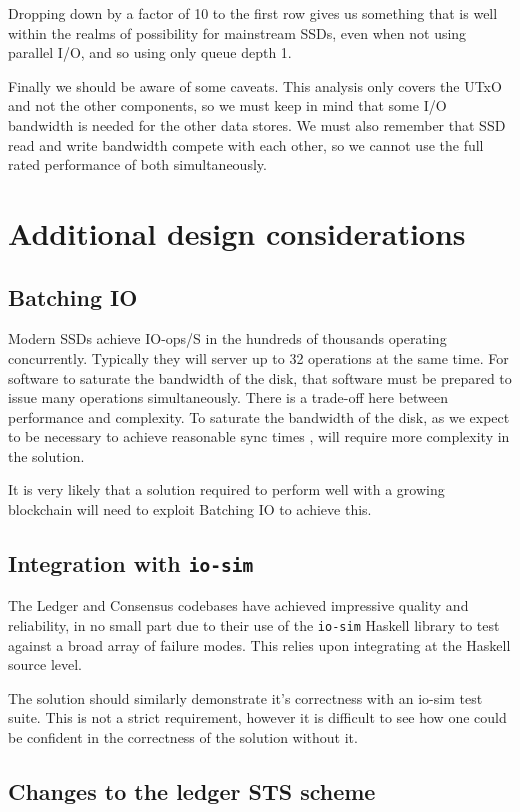\documentclass[11pt,a4paper]{article}
\begin{document}
Dropping down by a factor of 10 to the first row gives us something that is
well within the realms of possibility for mainstream SSDs, even when not using
parallel I/O, and so using only queue depth 1.

Finally we should be aware of some caveats. This analysis only covers the UTxO
and not the other components, so we must keep in mind that some I/O bandwidth
is needed for the other data stores. We must also remember that SSD read and
write bandwidth compete with each other, so we cannot use the full rated
performance of both simultaneously.

\section{Additional design considerations}

\subsection{Batching IO}
\label{Batching IO}
Modern SSDs achieve IO-ops/S in the hundreds of thousands operating concurrently.
Typically they will server up to 32 operations at the same time. For software to
saturate the bandwidth of the disk, that software must be prepared to issue many
operations simultaneously. There is a trade-off here between performance and
complexity. To saturate the bandwidth of the disk, as we expect to be necessary
to achieve reasonable sync times , will require more complexity in
the solution.

It is very likely that a solution required to perform well with a growing
blockchain will need to exploit Batching IO to achieve this.

\subsection{Integration with {\tt io-sim}}
\label{io-sim}
The Ledger and Consensus codebases have achieved impressive quality
and reliability, in no small part due to their use of the {\tt io-sim}
Haskell library to test against a broad array of failure modes. This
relies upon integrating at the Haskell source level.

The solution should similarly demonstrate it's correctness with an io-sim test
suite. This is not a strict requirement, however it is difficult to see how one
could be confident in the correctness of the solution without it.

\subsection{Changes to the ledger STS scheme}
\end{document}
